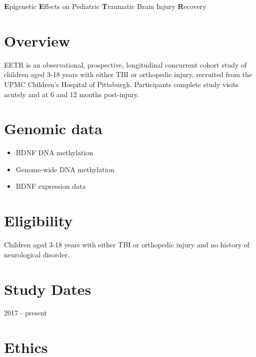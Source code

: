 \documentclass[
  letterpaper,
  DIV=11,
  numbers=noendperiod]{scrreprt}
\providecommand{\tightlist}{%
  \setlength{\itemsep}{0pt}\setlength{\parskip}{0pt}}\usepackage{longtable,booktabs,array}
\begin{document}
\textbf{E}pigenetic \textbf{E}ffects on Pediatric \textbf{T}raumatic
Brain Injury \textbf{R}ecovery

\section*{Overview}\label{overview-3}


EETR is an observational, prospective, longitudinal concurrent cohort
study of children aged 3-18 years with either TBI or orthopedic injury,
recruited from the UPMC Children's Hospital of Pittsburgh. Participants
complete study visits acutely and at 6 and 12 months post-injury.

\section*{Genomic data}\label{genomic-data-1}


\begin{itemize}
\tightlist
\item
  BDNF DNA methylation
\item
  Genome-wide DNA methylation
\item
  BDNF expression data
\end{itemize}

\section*{Eligibility}\label{eligibility-3}


Children aged 3-18 years with either TBI or orthopedic injury and no
history of neurological disorder.

\section*{Study Dates}\label{study-dates-3}


2017 - present

\section*{Ethics}\label{ethics-3}
\end{document}
